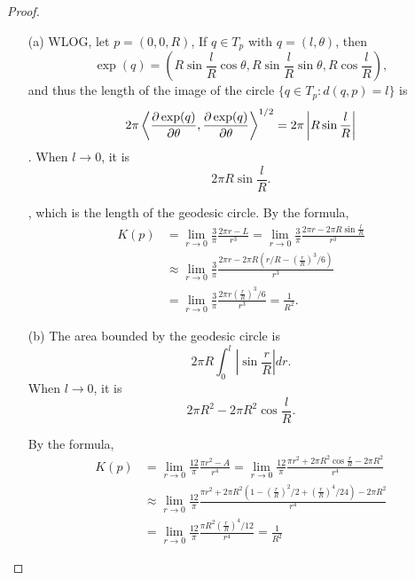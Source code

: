 \documentclass[10pt,a4paper]{article}
\begin{document}
\begin{proof}
\begin{enumerate}
\item[(a)]
WLOG, let $p = (0, 0, R)$, If $q\in T_p$ with $q = (l, \theta)$, then
$$
\exp(q) = \left(R\sin\frac{l}{R}\cos\theta, R\sin\frac{l}{R}\sin\theta, R\cos\frac{l}{R}\right),
$$
and thus the length of the image of the circle $\{q\in T_p : d(q, p) = l\}$ is
$$
2\pi\left\langle\frac{\partial \exp(q)}{\partial \theta}, \frac{\partial \exp(q)}{\partial \theta}\right\rangle^{1/2} = 2\pi\left|R\sin\frac{l}{R}\right|
$$
. When $l\rightarrow 0$, it is $$2\pi R\sin\frac{l}{R}.$$

, which is the length of the geodesic circle. By the formula,
\begin{align*}
K(p) &= \lim_{r\rightarrow 0}\frac{3}{\pi}\frac{2\pi r - L}{r^3} = \lim_{r\rightarrow 0}\frac{3}{\pi}\frac{2\pi r - 2\pi R\sin\frac{l}{R}}{r^3}\\ &\approx \lim_{r\rightarrow 0}\frac{3}{\pi}\frac{2\pi r - 2\pi R\left(r/R - \left(\frac rR\right)^3/6\right)}{r^3} \\ &=
\lim_{r\rightarrow 0}\frac{3}{\pi}\frac{2\pi r\left(\frac rR\right)^3/6}{r^3} = \frac{1}{R^2}.
\end{align*}

\item[(b)]
The area bounded by the geodesic circle is
$$
2\pi R\int^l_0 \left|\sin\frac{r}{R}\right| dr.
$$
When $l\rightarrow 0$, it is $$2\pi R^2 - 2\pi R^2\cos\frac lR.$$

By the formula, 
\begin{align*}
K(p) &= \lim_{r\rightarrow 0}\frac{12}{\pi}\frac{\pi r^2 - A}{r^4} = \lim_{r\rightarrow 0}\frac{12}{\pi}\frac{\pi r^2 + 2\pi R^2\cos\frac rR - 2\pi R^2}{r^4}\\ &\approx \lim_{r\rightarrow 0}\frac{12}{\pi}\frac{\pi r^2 + 2\pi R^2\left(1 - \left(\frac rR\right)^2/2 + \left(\frac rR\right)^4/24\right) - 2\pi R^2}{r^4} \\ &=
\lim_{r\rightarrow 0}\frac{12}{\pi}\frac{\pi R^2\left(\frac rR\right)^4/12}{r^4} = \frac{1}{R^2}
\end{align*}
\end{enumerate}
\end{proof}
\end{document}
